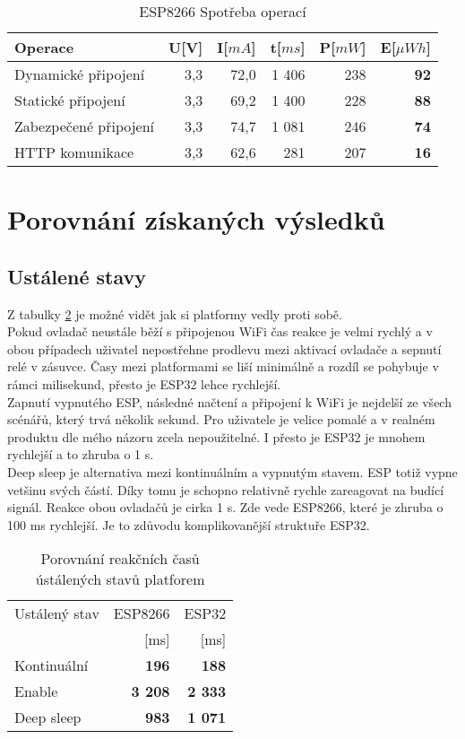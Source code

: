 \documentclass[a4paper, 12pt]{report}
\begin{document}
				\begin{table}[h]
					\centering
					\caption{ESP8266 Spotřeba operací}
					\begin{tabular}{||l| r r r r |r||}
						\hline
						Operace & U[V] & I[$mA$] & t[$ms$] & P[$mW$] & \textbf{E}[$\mu Wh$]\\
						\hline
						\hline
					Dynamické připojení & 3,3 & 72,0 & 1 406 & 238 & \textbf{92}\\
					Statické připojení & 3,3 & 69,2 & 1 400 & 228 & \textbf{88}\\
					Zabezpečené připojení & 3,3 & 74,7 & 1 081 & 246 & \textbf{74}\\
					HTTP komunikace & 3,3 & 62,6 & 281 & 207 & \textbf{16}\\
					\hline
					\end{tabular}
					\label{Spotreba_operaci}
				\end{table}


		\section{Porovnání získaných výsledků}
			\subsection{Ustálené stavy}
			Z tabulky \ref{Porovnání klidové režimy čas} je možné vidět jak si platformy vedly proti sobě. \\
			Pokud ovladač neustále běží s připojenou WiFi čas reakce je velmi rychlý a v obou případech uživatel nepostřehne prodlevu mezi aktivací ovladače a sepnutí relé v zásuvce. Časy mezi platformami se liší minimálně a rozdíl se pohybuje v rámci milisekund, přesto je ESP32 lehce rychlejší. \\
			Zapnutí vypnutého ESP, následné načtení a připojení k WiFi je nejdelší ze všech scénářů, který trvá několik sekund. Pro uživatele je velice pomalé a v realném produktu dle mého názoru zcela nepoužitelné. I přesto je ESP32 je mnohem rychlejší a to zhruba o 1 \si{s}. \\
			Deep sleep je alternativa mezi kontinuálním a vypnutým stavem. ESP totiž vypne vetšinu svých částí. Díky tomu je schopno relativně rychle zareagovat na budící signál. Reakce obou ovladačů je cirka 1 \si{s}. Zde vede ESP8266, které je zhruba o 100 \si{ms} rychlejší. Je to zdůvodu komplikovanější struktuře ESP32.

			\begin{table}[h]
				\centering
				\caption{Porovnání reakčních časů ústálených stavů platforem}
				\begin{tabular}{||l|r r||}
					\hline
					Ustálený stav & ESP8266 & ESP32 \\
					& [ms] & [ms] \\
					\hline
					Kontinuální & {\bf 196} & {\bf 188}\\
					Enable & {\bf 3 208} & {\bf 2 333}\\
					Deep sleep & {\bf 983} & {\bf 1 071}\\
					\hline
				\end{tabular}
				\label{Porovnání klidové režimy čas}
			\end{table}
\end{document}
